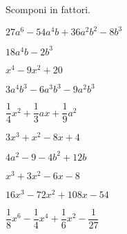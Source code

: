 
\begin{esercizio}
 Scomponi in fattori.
 \begin{multicols}{2}
 \begin{enumeratea}
\item $27a^{6} - 54a^{4}b + 36a^{2}b^{2} - 8b^{3}$
\item $18a^{4}b - 2b^{3}$
\item $x^{4} - 9x^{2} + 20$
\item $3a^{4}b^{3} - 6a^{3}b^{3} - 9a^{2}b^{3}$
\item $\dfrac{1}{4}x^{2}+\dfrac{1}{3}ax+\dfrac{1}{9}a^{2}$
\item $3x^{3} + x^{2} - 8x + 4$
\item $4a^{2} - 9 - 4b^{2} + 12b $
\item $x^{3} + 3x^{2} - 6x - 8$
\item $16x^{3}-72x^{2}+108x-54$
\item $\dfrac{1}{8}x^{6}-\dfrac{1}{4}x^{4}+\dfrac{1}{6}x^{2}-\dfrac{1}{27}$
 \end{enumeratea}
 \end{multicols}
\end{esercizio}

